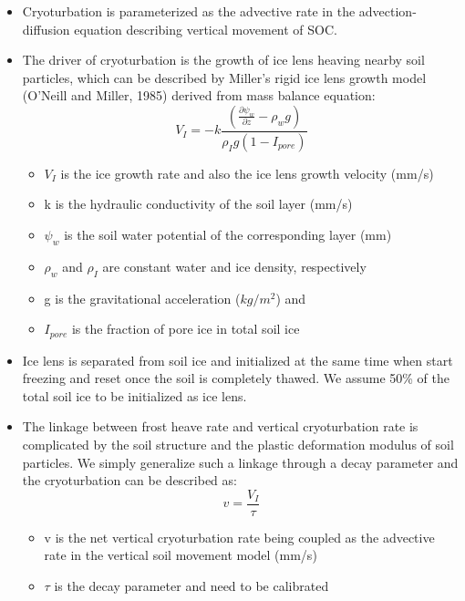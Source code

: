 \documentclass[portait,custom]{sciposter}
\begin{document}
\begin{multicols*}{4}
\begin{itemize}
 \item Cryoturbation is parameterized as the advective rate in the advection-diffusion equation describing vertical movement of SOC.
 \item The driver of cryoturbation is the growth of ice lens heaving nearby soil particles, which can be described by Miller's rigid ice lens growth model (O'Neill and Miller, 1985) derived from mass balance equation:
   \begin{equation}
   V_I=-k\frac{(\frac{\partial\psi_w}{\partial z}-\rho_wg)}{\rho_Ig(1-I_{pore})} 
   \end{equation}
   \begin{itemize}
     \item $V_I$ is the ice growth rate and also the ice lens growth velocity (mm/s)
     \item k is the hydraulic conductivity of the soil layer (mm/s)
     \item $\psi_w$ is the soil water potential of the corresponding layer (mm)
     \item $\rho_w$ and $\rho_I$ are constant water and ice density, respectively
     \item g is the gravitational acceleration ($kg/m^2$)
     and\\ 
     \item $I_{pore}$ is the fraction of pore ice in total soil ice
   \end{itemize}
   \item Ice lens is  separated from soil ice and initialized at the same time when start freezing and reset once the soil is completely thawed. We assume 50\% of the total soil ice to be initialized as ice lens.
 \item The linkage between frost heave rate and vertical cryoturbation rate is complicated by the soil structure and the plastic deformation modulus of soil particles. We simply generalize such a linkage through a decay parameter and the cryoturbation can be described as:
  \begin{equation}
  v=\frac{V_I}{\tau}
  \end{equation}
  \begin{itemize}
     \item v is the net vertical cryoturbation rate being coupled as the advective rate in the vertical soil movement model (mm/s)
     \item $\tau$ is the decay parameter and need to be calibrated
  \end{itemize}
\end{itemize}


\end{multicols*}
\end{document}

